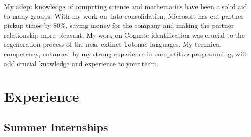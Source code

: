 \documentclass{friggeri-cv} %
\begin{document}
My adept knowledge of computing science and mathematics have been a solid aid to many groups. With my work on data-consolidation, Microsoft has cut partner pickup times by 80\%, saving money for the company and making the partner relationship more pleasant. My work on Cognate identification was crucial to the regeneration process of the near-extinct Totonac languages. My technical competency, enhanced by my strong experience in competitive programming, will add crucial knowledge and experience to your team.


\section{Experience}

\subsection{Summer Internships}
\end{document}
